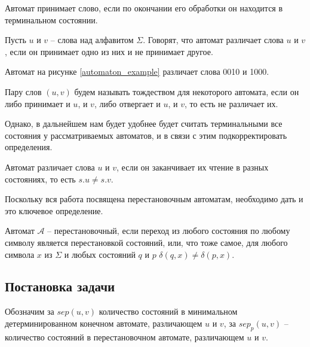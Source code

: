 \begin{definition}
	Автомат принимает слово, если по окончании его обработки он находится в терминальном состоянии.
\end{definition}
\begin{definition}
	Пусть $u$ и $v$ – слова над алфавитом $\Sigma$. Говорят, что автомат различает слова $u$ и $v$, если он принимает одно из них и не принимает другое. 
\end{definition}

\begin{example}
	Автомат на рисунке \ref{automaton_example} различает слова 0010 и 1000.
\end{example}

\label{automaton_example}

\begin{definition}
	Пару слов $(u, v)$ будем называть тождеством для некоторого автомата, если он либо принимает и $u$, и $v$, либо отвергает и $u$, и $v$, то есть не различает их.
\end{definition}

Однако, в дальнейшем нам будет удобнее будет считать терминальными все состояния у рассматриваемых автоматов, и в связи с этим подкорректировать определения.

\begin{definition}
	Автомат различает слова $u$ и $v$, если он заканчивает их чтение в разных состояниях, то есть $s.u \ne s.v$. 
\end{definition}

Поскольку вся работа посвящена перестановочным автоматам, необходимо дать и это ключевое определение.
\begin{definition} 
	Автомат $\mathscr{A}$ – перестановочный, если переход из любого состояния по любому символу является перестановкой состояний, или, что тоже самое, для любого символа $x$ из $\Sigma$ и любых состояний $q$ и $p$ $\delta(q, x) \ne \delta(p, x)$.
\end{definition}

\subsection{Постановка задачи}
 
Обозначим за $sep(u, v)$ количество состояний в минимальном детерминированном конечном автомате, различающем $u$ и $v$, за $sep_p(u, v)$ – количество состояний в перестановочном автомате, различающем $u$ и $v$.

